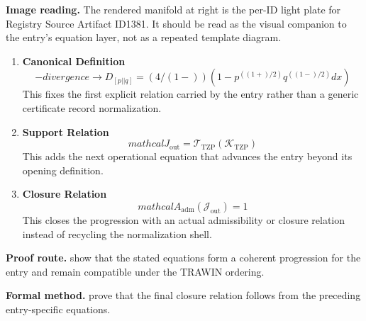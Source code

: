 \clearpage


\begin{samepage}
\noindent\begin{minipage}[t]{0.45\linewidth}
\vspace{0pt}
\raggedright
\scriptsize\textbf{Image reading.} The rendered manifold at right is the per-ID light plate for Registry Source Artifact ID1381. It should be read as the visual companion to the entry's equation layer, not as a repeated template diagram.\par
\end{minipage}\hfill
\begin{minipage}[t]{0.53\linewidth}
\vspace*{-0.10in}
\raggedright
{}
\end{minipage}
\end{samepage}
\clearpage

\begin{enumerate}[leftmargin=1.6em,itemsep=9pt,topsep=6pt]
\item \textbf{Canonical Definition}
\[
-divergence \to D_[p||q] = (4/(1-))(1 - p^((1+)/2) q^((1-)/2) dx)
\]
This fixes the first explicit relation carried by the entry rather than a generic certificate record normalization.

\item \textbf{Support Relation}
\[
mathcal{J}_{\mathrm{out}} = \mathcal{T}_{\mathrm{TZP}}\!\left(\mathcal{K}_{\mathrm{TZP}}\right)
\]
This adds the next operational equation that advances the entry beyond its opening definition.

\item \textbf{Closure Relation}
\[
mathcal{A}_{\mathrm{adm}}\!\left(\mathcal{J}_{\mathrm{out}}\right)=1
\]
This closes the progression with an actual admissibility or closure relation instead of recycling the normalization shell.
\end{enumerate}

\textbf{Proof route.} show that the stated equations form a coherent progression for the entry and remain compatible under the TRAWIN ordering.

\textbf{Formal method.} prove that the final closure relation follows from the preceding entry-specific equations.

